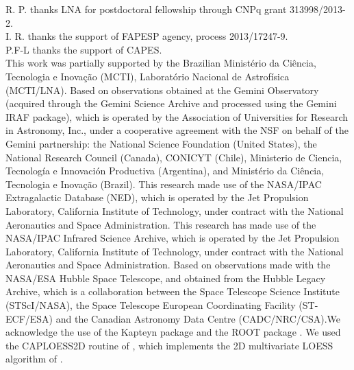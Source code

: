 \documentclass[fleqn,usenatbib]{mnras}
\begin{document}
R. P. thanks LNA for postdoctoral fellowship through CNPq grant 313998/2013-2.\\
I. R. thanks the support of FAPESP agency, process 2013/17247-9.\\
P.F-L thanks the support of CAPES.\\
This work was partially supported by the Brazilian Minist\'{e}rio da Ci\^{e}ncia, Tecnologia e Inova\c{c}\~{a}o (MCTI), Laborat\'{o}rio Nacional de 
Astrof\'{i}sica (MCTI/LNA). Based on observations obtained at the Gemini Observatory (acquired through the Gemini Science Archive and processed 
using the Gemini IRAF package), which is operated by the Association of Universities for Research in Astronomy, Inc., under a cooperative agreement with 
the NSF on behalf of the Gemini partnership: the National Science Foundation (United States), the National Research Council (Canada), CONICYT (Chile), 
Ministerio de Ciencia, Tecnolog\'{i}a e Innovaci\'{o}n Productiva (Argentina), and Minist\'{e}rio da Ci\^{e}ncia, 
Tecnologia e Inova\c{c}\~{a}o (Brazil). This research made use of the NASA/IPAC Extragalactic Database (NED), which is operated by the Jet Propulsion Laboratory,
California Institute of Technology, under contract with the National Aeronautics and Space Administration. This research has made use of the NASA/IPAC Infrared
Science Archive, which is operated by the Jet Propulsion Laboratory, California Institute of Technology, under contract with the National Aeronautics and Space
Administration. Based on observations made with the NASA/ESA Hubble Space Telescope, and obtained from the Hubble Legacy Archive, which is a collaboration between
the Space Telescope Science Institute (STScI/NASA), the Space Telescope European Coordinating Facility (ST-ECF/ESA) and the Canadian Astronomy Data Centre 
(CADC/NRC/CSA).We acknowledge the use of the Kapteyn package \citep{KapteynPackage} and the ROOT package \citep{ReneBrun}. We used the CAPLOESS2D routine of 
\citet{Cappellari2013}, which implements the 2D multivariate LOESS algorithm of \citet{Cleveland1988}.

%
%
\end{document}
